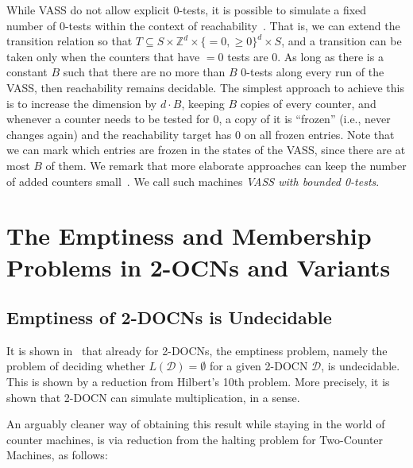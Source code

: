 \documentclass[USenglish]{lipics-v2021}
\newcommand{\bbZ}{\mathbb{Z}}
\newcommand{\cD}{\mathcal{D}}
\begin{document}
	While VASS do not allow explicit 0-tests, it is possible to simulate a fixed
	number of 0-tests within the context of
	reachability~\cite{czerwinski2020reachability,czerwinski2022reachability}. That
	is, we can extend the transition relation so that $T\subseteq S\times \bbZ^d\times \{=0,\ge 0\}^d \times
	S$, and a transition can be taken only when the counters that have $=0$ tests
	are 0. As long as there is a constant \(B\) such that there are no more than $B$
	0-tests along every run of the VASS, then reachability remains decidable.  The
	simplest approach to achieve this is to increase the dimension by $d\cdot B$,
	keeping $B$ copies of every counter, and whenever a counter needs to be tested
	for 0, a copy of it is ``frozen'' (i.e., never changes again) and the
	reachability target has $0$ on all frozen entries. Note that we can mark which
	entries are frozen in the states of the VASS, since there are at most $B$ of
	them. We remark that more elaborate approaches can keep the number of added
	counters small~\cite{czerwinski2020reachability,czerwinski2022reachability}.  We
	call such machines \emph{VASS with bounded 0-tests}.
	
	\section{The Emptiness and Membership Problems in 2-OCNs and Variants}
	\subsection{Emptiness of 2-DOCNs is Undecidable}
	\label{sec:DOCN_undec}
	It is shown in~\cite{chan1987two} that already for 2-DOCNs, the emptiness problem, namely the problem of deciding whether $L(\cD)= \emptyset$ for a given 2-DOCN $\cD$, is undecidable. This is shown by a reduction from Hilbert's 10th problem. More precisely, it is shown that 2-DOCN can simulate multiplication, in a sense.
	
	An arguably cleaner way of obtaining this result while staying in the world of
	counter machines, is via reduction from the halting problem for Two-Counter
	Machines, as follows:
	
\end{document}
